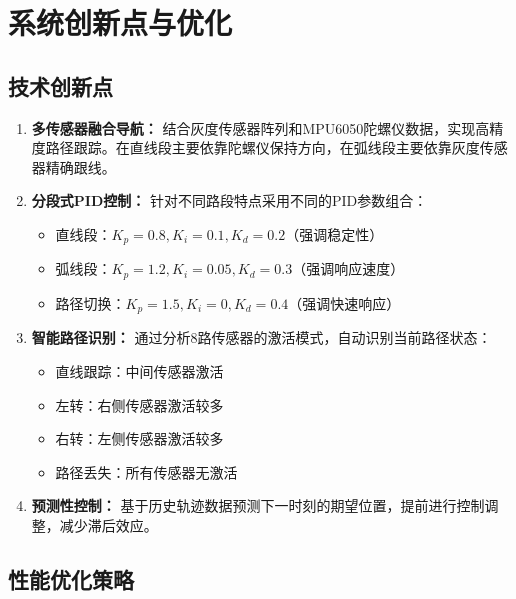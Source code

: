 \documentclass[UTF8]{ctexart}
\begin{document}
\section{系统创新点与优化}

\subsection{技术创新点}

\begin{enumerate}
    \item \textbf{多传感器融合导航：} 结合灰度传感器阵列和MPU6050陀螺仪数据，实现高精度路径跟踪。在直线段主要依靠陀螺仪保持方向，在弧线段主要依靠灰度传感器精确跟线。
    
    \item \textbf{分段式PID控制：} 针对不同路段特点采用不同的PID参数组合：
    \begin{itemize}
        \item 直线段：$K_p=0.8, K_i=0.1, K_d=0.2$（强调稳定性）
        \item 弧线段：$K_p=1.2, K_i=0.05, K_d=0.3$（强调响应速度）
        \item 路径切换：$K_p=1.5, K_i=0, K_d=0.4$（强调快速响应）
    \end{itemize}
    
    \item \textbf{智能路径识别：} 通过分析8路传感器的激活模式，自动识别当前路径状态：
    \begin{itemize}
        \item 直线跟踪：中间传感器激活
        \item 左转：右侧传感器激活较多
        \item 右转：左侧传感器激活较多
        \item 路径丢失：所有传感器无激活
    \end{itemize}
    
    \item \textbf{预测性控制：} 基于历史轨迹数据预测下一时刻的期望位置，提前进行控制调整，减少滞后效应。
\end{enumerate}

\subsection{性能优化策略}
\end{document}
